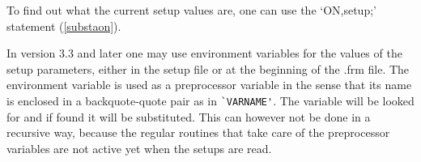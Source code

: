 To find out what the current setup values are, one can use the `ON,setup;' 
statement (\ref{substaon}).

In version 3.3 and later one may use environment 
variables for the values of the setup parameters, either in the setup file 
or at the beginning of the .frm file. The environment variable is used as a 
preprocessor variable in the sense that its name is enclosed in a 
backquote-quote pair as in \verb:`VARNAME':. The variable will be looked 
for and if found it will be substituted. This can however not be done in a 
recursive way, because the regular routines that take care of the 
preprocessor variables are not active yet when the setups are read.
